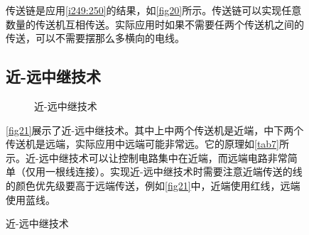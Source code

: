 \begin{figure}[!ht]
传送链是应用\autoref{i249:250}的结果，如\autoref{fig20}所示。传送链可以实现任意数量的传送机互相传送。实际应用时如果不需要任两个传送机之间的传送，可以不需要摆那么多横向的电线。

\subsection{近-远中继技术}\label{sec16}
\begin{figure}[!ht]
\centering
{}
\qquad
{}
\caption{近-远中继技术}
\end{figure}
\autoref{fig21}展示了近-远中继技术。其中上中两个传送机是近端，中下两个传送机是远端，实际应用中远端可能非常远。它的原理如\autoref{tab7}所示。近-远中继技术可以让控制电路集中在近端，而远端电路非常简单（仅用一根线连接）。实现近-远中继技术时需要注意近端传送的线的颜色优先级要高于远端传送，例如\autoref{fig21}中，近端使用红线，远端使用蓝线。


\end{figure}
